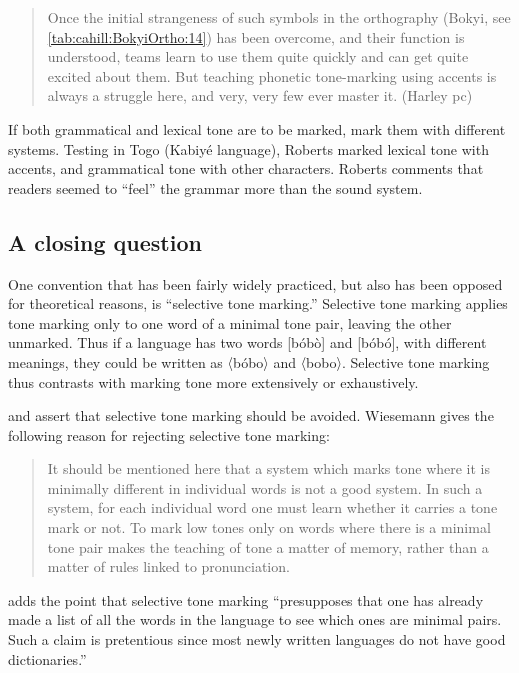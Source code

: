 \documentclass[output=paper]{langscibook}
\begin{document}
\begin{quote}
Once the initial strangeness of such symbols in the orthography (Bokyi, see \ref{tab:cahill:BokyiOrtho:14}) has been overcome, and their function is understood, teams learn to use them quite quickly and can get quite excited about them. But teaching phonetic tone-marking using accents is always a struggle here, and very, very few ever master it. (Harley pc)
\end{quote}

If both grammatical and lexical tone are to be marked, mark them with different systems. Testing in Togo (Kabiyé language), Roberts marked lexical tone with accents, and grammatical tone with other characters. Roberts comments that readers seemed to “feel” the grammar more than the sound system. 

\subsection{A closing question}
\label{sec:Conclusion:ClosingQuestion:2}
One convention that has been fairly widely practiced, but also has been opposed for theoretical reasons, is “selective tone marking.” Selective tone marking applies tone marking only to one word of a minimal tone pair, leaving the other unmarked. Thus if a language has two words [bóbò] and [bóbó], with different meanings, they could be written as 〈bóbo〉 and 〈bobo〉. Selective tone marking thus contrasts with marking tone more extensively or exhaustively.

\citet[16]{Wiesemann1989} and \citet[132--133]{Longacre1953} assert that selective tone marking should be avoided. Wiesemann gives the following reason for rejecting selective tone marking:

\begin{quote}
It should be mentioned here that a system which marks tone where it is minimally different in individual words is not a good system. In such a system, for each individual word one must learn whether it carries a tone mark or not. To mark low tones only on words where there is a minimal tone pair makes the teaching of tone a matter of memory, rather than a matter of rules linked to pronunciation.
\end{quote}

\citet[133]{Longacre1953} adds the point that selective tone marking “presupposes that one has already made a list of all the words in the language to see which ones are minimal pairs. Such a claim is pretentious since most newly written languages do not have good dictionaries.” 
\end{document}
